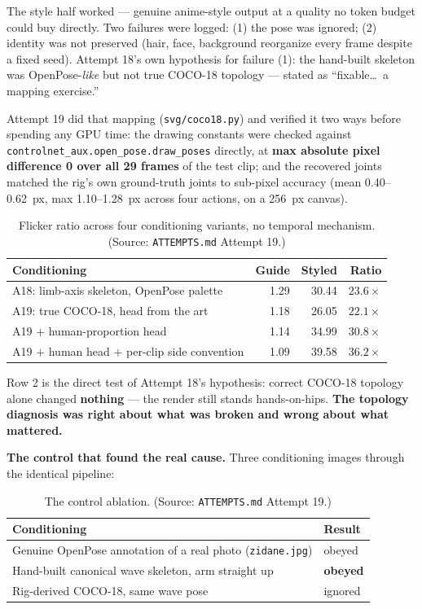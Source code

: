 \documentclass[11pt]{article}
\begin{document}
The style half worked --- genuine anime-style output at a quality no token
budget could buy directly. Two failures were logged: (1) the pose was
ignored; (2) identity was not preserved (hair, face, background reorganize
every frame despite a fixed seed). Attempt 18's own hypothesis for
failure (1): the hand-built skeleton was OpenPose-\emph{like} but not true
COCO-18 topology --- stated as ``fixable\ldots\ a mapping exercise.''

Attempt 19 did that mapping (\texttt{svg/coco18.py}) and verified it two
ways before spending any GPU time: the drawing constants were checked
against \texttt{controlnet\_aux.open\_pose.draw\_poses} directly, at
\textbf{max absolute pixel difference 0 over all 29 frames} of the test
clip; and the recovered joints matched the rig's own ground-truth joints
to sub-pixel accuracy (mean 0.40--0.62~px, max 1.10--1.28~px across four
actions, on a 256~px canvas).

\begin{table}[h]
\centering
\caption{Flicker ratio across four conditioning variants, no temporal
mechanism. (Source: \texttt{ATTEMPTS.md} Attempt 19.)}
\label{tab:a19flicker}
\begin{tabular}{@{}L{6.5cm}rrr@{}}
\toprule
Conditioning & Guide & Styled & Ratio \\
\midrule
A18: limb-axis skeleton, OpenPose palette & 1.29 & 30.44 & $\mathbf{23.6\times}$ \\
A19: true COCO-18, head from the art & 1.18 & 26.05 & $22.1\times$ \\
A19 + human-proportion head & 1.14 & 34.99 & $30.8\times$ \\
A19 + human head + per-clip side convention & 1.09 & 39.58 & $\mathbf{36.2\times}$ \\
\bottomrule
\end{tabular}
\end{table}

Row 2 is the direct test of Attempt 18's hypothesis: correct COCO-18
topology alone changed \textbf{nothing} --- the render still stands
hands-on-hips. \textbf{The topology diagnosis was right about what was
broken and wrong about what mattered.}

\textbf{The control that found the real cause.} Three conditioning
images through the identical pipeline:

\begin{table}[h]
\centering
\caption{The control ablation. (Source: \texttt{ATTEMPTS.md} Attempt 19.)}
\label{tab:controlablation}
\begin{tabular}{@{}L{7cm}l@{}}
\toprule
Conditioning & Result \\
\midrule
Genuine OpenPose annotation of a real photo (\texttt{zidane.jpg}) & obeyed \\
Hand-built canonical wave skeleton, arm straight up & \textbf{obeyed} \\
Rig-derived COCO-18, same wave pose & ignored \\
\bottomrule
\end{tabular}
\end{table}
\end{document}
